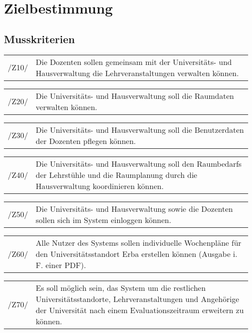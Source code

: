 \section{Zielbestimmung}
\label{sec:Zielbestimmung}

\subsection{Musskriterien}

\begin{tabular}{p{1.5cm}p{14.5cm}}	
	 /Z10/& Die Dozenten sollen gemeinsam mit der Universitäts- und Hausverwaltung die Lehrveranstaltungen verwalten können. \\[0.25cm]
\end{tabular}

\begin{tabular}{p{1.5cm}p{14.5cm}}	
	 /Z20/& Die Universitäts- und Hausverwaltung soll die Raumdaten verwalten können. \\[0.25cm]
\end{tabular}

\begin{tabular}{p{1.5cm}p{14.5cm}}	
	 /Z30/& Die Universitäts- und Hausverwaltung soll die Benutzerdaten der Dozenten pflegen können. \\[0.25cm]
\end{tabular}

\begin{tabular}{p{1.5cm}p{14.5cm}}	
	 /Z40/& Die Universitäts- und Hausverwaltung soll den Raumbedarfs der Lehrstühle und die Raumplanung durch die Hausverwaltung koordinieren können.  \\[0.25cm]
\end{tabular}

\begin{tabular}{p{1.5cm}p{14.5cm}}	
	 /Z50/& Die Universitäts- und Hausverwaltung sowie die Dozenten sollen sich im System einloggen können. \\[0.25cm]
\end{tabular}

\begin{tabular}{p{1.5cm}p{14.5cm}}	
	 /Z60/& Alle Nutzer des Systems sollen individuelle Wochenpläne für den Universitätsstandort Erba erstellen können (Ausgabe i. F. einer PDF). \\[0.25cm]
\end{tabular}

\begin{tabular}{p{1.5cm}p{14.5cm}}	
	 /Z70/& Es soll möglich sein,  das System um die restlichen Universitätsstandorte, Lehrveranstaltungen und Angehörige der Universität nach einem Evaluationszeitraum erweitern zu können. \\[0.25cm]
\end{tabular}

